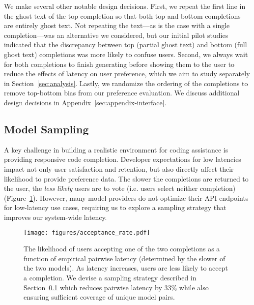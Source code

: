 We make several other notable design decisions.
First, we repeat the first line in the ghost text of the top completion so that both top and bottom completions are entirely ghost text.
Not repeating the text---as is the case with a single completion---was an alternative we considered, but our initial pilot studies indicated that the discrepancy between top (partial ghost text) and bottom (full ghost text) completions was more likely to confuse users. 
Second, we always wait for both completions to finish generating before showing them to the user to reduce the effects of latency on user preference,
which we aim to study separately in  Section~\ref{sec:analysis}.
Lastly, we randomize the ordering of the completions to remove top-bottom bias from our preference evaluation.
We discuss additional design decisions in Appendix~\ref{sec:appendix-interface}.



\subsection{Model Sampling}\label{subsec:sampling}

A key challenge in building a realistic environment for coding assistance is providing responsive code completion.
Developer expectations for low latencies impact not only user satisfaction and retention, but also directly affect their likelihood to provide preference data.
The slower the completions are returned to the user, the \textit{less likely} users are to vote (i.e. users select neither completion) (Figure~\ref{fig:acceptance_rate}). 
However, many model providers do not optimize their API endpoints for low-latency use cases, requiring us to explore a sampling strategy that improves our system-wide latency.


\begin{figure}[t]
\centering
\texttt{[image: figures/acceptance\_rate.pdf]}
\vspace{-0.5cm}
\caption{
The likelihood of users accepting one of the two completions as a function of empirical pairwise latency (determined by the slower of the two models). 
As latency increases, users are less likely to accept a completion.
We devise a sampling strategy described in Section~\ref{subsec:sampling} which reduces pairwise latency by 33\% while also ensuring sufficient coverage of unique model pairs.}
\label{fig:acceptance_rate}
\end{figure}


